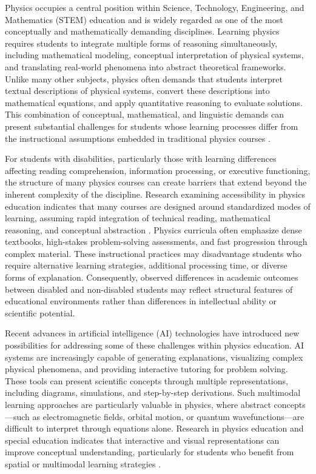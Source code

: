 \documentclass[]{aastex701}
\begin{document}
Physics occupies a central position within Science, Technology, Engineering, and Mathematics (STEM) education and is widely regarded as one of the most conceptually and mathematically demanding disciplines. Learning physics requires students to integrate multiple forms of reasoning simultaneously, including mathematical modeling, conceptual interpretation of physical systems, and translating real-world phenomena into abstract theoretical frameworks. Unlike many other subjects, physics often demands that students interpret textual descriptions of physical systems, convert these descriptions into mathematical equations, and apply quantitative reasoning to evaluate solutions. This combination of conceptual, mathematical, and linguistic demands can present substantial challenges for students whose learning processes differ from the instructional assumptions embedded in traditional physics courses \citep{Chasen2025, Gull2025}.

For students with disabilities, particularly those with learning differences affecting reading comprehension, information processing, or executive functioning, the structure of many physics courses can create barriers that extend beyond the inherent complexity of the discipline. Research examining accessibility in physics education indicates that many courses are designed around standardized modes of learning, assuming rapid integration of technical reading, mathematical reasoning, and conceptual abstraction \citep{Chasen2025, AlAzawei2023}. Physics curricula often emphasize dense textbooks, high-stakes problem-solving assessments, and fast progression through complex material. These instructional practices may disadvantage students who require alternative learning strategies, additional processing time, or diverse forms of explanation. Consequently, observed differences in academic outcomes between disabled and non-disabled students may reflect structural features of educational environments rather than differences in intellectual ability or scientific potential.

Recent advances in artificial intelligence (AI) technologies have introduced new possibilities for addressing some of these challenges within physics education. AI systems are increasingly capable of generating explanations, visualizing complex physical phenomena, and providing interactive tutoring for problem solving. These tools can present scientific concepts through multiple representations, including diagrams, simulations, and step-by-step derivations. Such multimodal learning approaches are particularly valuable in physics, where abstract concepts---such as electromagnetic fields, orbital motion, or quantum wavefunctions---are difficult to interpret through equations alone. Research in physics education and special education indicates that interactive and visual representations can improve conceptual understanding, particularly for students who benefit from spatial or multimodal learning strategies \citep{Voultsiou2025, HarkinsBrown2025, Singh2001}.
\end{document}
